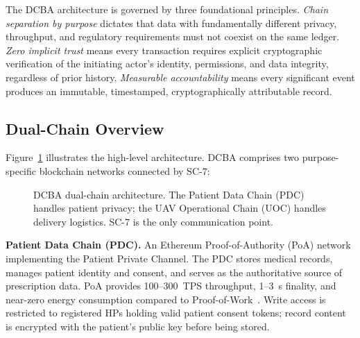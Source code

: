 \documentclass[sigplan,screen,review=false]{acmart}
\begin{document}
The DCBA architecture is governed by three foundational principles.
\emph{Chain separation by purpose} dictates that data with
fundamentally different privacy, throughput, and regulatory requirements
must not coexist on the same ledger. \emph{Zero implicit trust} means
every transaction requires explicit cryptographic verification of the
initiating actor's identity, permissions, and data integrity,
regardless of prior history. \emph{Measurable accountability} means
every significant event produces an immutable, timestamped,
cryptographically attributable record.

\subsection{Dual-Chain Overview}

Figure~\ref{fig:architecture} illustrates the high-level architecture.
DCBA comprises two purpose-specific blockchain networks connected by
SC-7:

\begin{figure}[h]
  \centering
  \caption{DCBA dual-chain architecture. The Patient Data Chain (PDC)
    handles patient privacy; the UAV Operational Chain (UOC) handles
    delivery logistics. SC-7 is the only communication point.}
  \label{fig:architecture}
\end{figure}

\textbf{Patient Data Chain (PDC).} An Ethereum Proof-of-Authority (PoA)
network implementing the Patient Private Channel. The PDC stores medical
records, manages patient identity and consent, and serves as the
authoritative source of prescription data. PoA provides 100--300~TPS
throughput, 1--3~s finality, and near-zero energy consumption compared
to Proof-of-Work~\cite{clique2017}. Write access is restricted to
registered HPs holding valid patient consent tokens; record content is
encrypted with the patient's public key before being stored.
\end{document}

